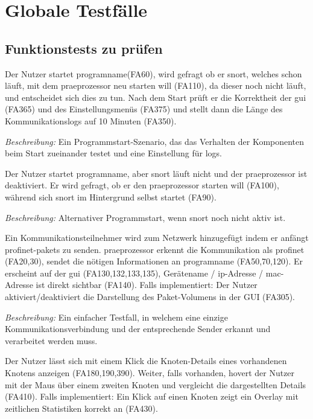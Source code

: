 \chapter{Globale Testfälle}

\section{Funktionstests zu prüfen}

\begin{description}[style=multiline, leftmargin=4cm, labelwidth=4cm]
  \item[\namedlabel{start}{Programm starten}] Der Nutzer startet \gls{programname}(FA60), wird gefragt ob er \gls{snort}, welches schon läuft, mit dem \gls{praeprozessor} neu starten will (FA110), da dieser noch nicht läuft, und entscheidet sich dies zu tun. Nach dem Start prüft er die Korrektheit der \gls{gui} (FA365) und des Einstellungsmenüs (FA375) und stellt dann die Länge des Kommunikationslogs auf 10 Minuten (FA350). \par
      \textit{Beschreibung:} Ein Programmstart-Szenario, das das Verhalten der Komponenten beim Start zueinander testet und eine Einstellung für \glspl{log}.
  \item[\namedlabel{altstart}{Alternativer Start}] Der Nutzer startet \gls{programname}, aber \gls{snort} läuft nicht und der \gls{praeprozessor} ist deaktiviert. Er wird gefragt, ob er den \gls{praeprozessor} starten will (FA100), während sich \gls{snort} im Hintergrund selbst startet (FA90). \par
      \textit{Beschreibung:} Alternativer Programmstart, wenn \gls{snort} noch nicht aktiv ist.
  \item[\namedlabel{addNetNode}{Kommunikationsteilnehmer hinzufügen}] Ein Kommunikationsteilnehmer wird zum Netzwerk hinzugefügt indem er anfängt \gls{profinet}-\glspl{paket} zu senden. \gls{praeprozessor} erkennt die Kommunikation als \gls{profinet} (FA20,30), sendet die nötigen Informationen an \gls{programname} (FA50,70,120). Er erscheint auf der \gls{gui} (FA130,132,133,135), Gerätename / \gls{ip}-Adresse / \gls{mac}-Adresse ist direkt sichtbar (FA140). Falls implementiert: Der Nutzer aktiviert/deaktiviert die Darstellung des Paket-Volumens in der GUI (FA305). \par
      \textit{Beschreibung:} Ein einfacher Testfall, in welchem eine einzige Kommunikationsverbindung und der entsprechende Sender erkannt und verarbeitet werden muss.
  \item[\namedlabel{infobox}{Details anzeigen}] Der Nutzer lässt sich mit einem Klick die Knoten-Details eines vorhandenen Knotens anzeigen (FA180,190,390). Weiter, falls vorhanden, hovert der Nutzer mit der Maus über einem zweiten Knoten und vergleicht die dargestellten Details (FA410). Falls implementiert: Ein Klick auf einen Knoten zeigt ein Overlay mit zeitlichen Statistiken korrekt an (FA430).

\end{description}
